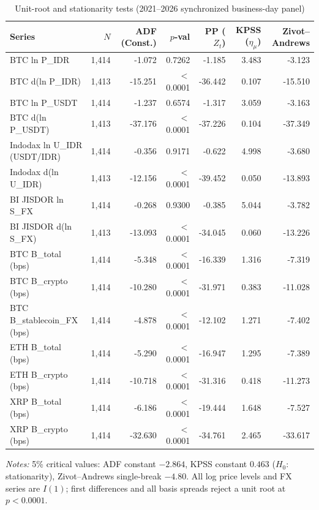 \begin{table}[htbp]
\centering
\caption{Unit-root and stationarity tests (2021--2026 synchronized business-day panel)}
\label{tab:unit_roots}
\fontsize{6.6}{7.8}\selectfont\setlength{\tabcolsep}{2pt}
\begingroup
\begin{tabular}{@{}>{\raggedright\arraybackslash}p{3.4cm}rrrrrr@{}}
\toprule
Series & $N$ & ADF (Const.) & $p$-val & PP ($Z_t$) & KPSS ($\eta_\mu$) & Zivot--Andrews \\
\midrule
BTC ln P\_IDR & 1,414 & -1.072 & 0.7262 & -1.185 & 3.483 & -3.123 \\
BTC d(ln P\_IDR) & 1,413 & -15.251 & $<$0.0001 & -36.442 & 0.107 & -15.510 \\
BTC ln P\_USDT & 1,414 & -1.237 & 0.6574 & -1.317 & 3.059 & -3.163 \\
BTC d(ln P\_USDT) & 1,413 & -37.176 & $<$0.0001 & -37.226 & 0.104 & -37.349 \\
Indodax ln U\_IDR (USDT/IDR) & 1,414 & -0.356 & 0.9171 & -0.622 & 4.998 & -3.680 \\
Indodax d(ln U\_IDR) & 1,413 & -12.156 & $<$0.0001 & -39.452 & 0.050 & -13.893 \\
BI JISDOR ln S\_FX & 1,414 & -0.268 & 0.9300 & -0.385 & 5.044 & -3.782 \\
BI JISDOR d(ln S\_FX) & 1,413 & -13.093 & $<$0.0001 & -34.045 & 0.060 & -13.226 \\
BTC B\_total (bps) & 1,414 & -5.348 & $<$0.0001 & -16.339 & 1.316 & -7.319 \\
BTC B\_crypto (bps) & 1,414 & -10.280 & $<$0.0001 & -31.971 & 0.383 & -11.028 \\
BTC B\_stablecoin\_FX (bps) & 1,414 & -4.878 & $<$0.0001 & -12.102 & 1.271 & -7.402 \\
ETH B\_total (bps) & 1,414 & -5.290 & $<$0.0001 & -16.947 & 1.295 & -7.389 \\
ETH B\_crypto (bps) & 1,414 & -10.718 & $<$0.0001 & -31.316 & 0.418 & -11.273 \\
XRP B\_total (bps) & 1,414 & -6.186 & $<$0.0001 & -19.444 & 1.648 & -7.527 \\
XRP B\_crypto (bps) & 1,414 & -32.630 & $<$0.0001 & -34.761 & 2.465 & -33.617 \\
\bottomrule
\end{tabular}\endgroup
\begin{minipage}{\textwidth}\footnotesize\vspace{3pt}
\emph{Notes:} 5\% critical values: ADF constant $-2.864$, KPSS constant $0.463$ ($H_0$: stationarity), Zivot--Andrews single-break $-4.80$. All log price levels and FX series are $I(1)$; first differences and all basis spreads reject a unit root at $p < 0.0001$.
\end{minipage}
\end{table}
